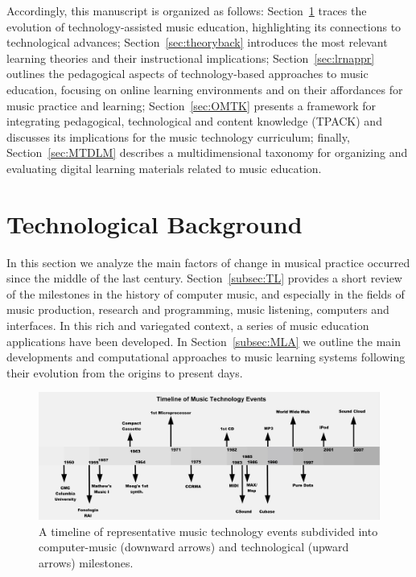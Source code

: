 \documentclass[journal]{IEEEtran}
\begin{document}
Accordingly, this manuscript is organized as follows: Section~\ref{sec:techback} traces the evolution of technology-assisted music education, highlighting its connections to technological advances; Section~\ref{sec:theoryback} introduces the most relevant learning theories and their instructional implications; Section~\ref{sec:lrnappr} outlines the pedagogical aspects of technology-based approaches to music education, focusing on online learning environments and on their affordances for music practice and learning; Section~\ref{sec:OMTK} presents a framework for integrating pedagogical, technological and content knowledge (TPACK) and discusses its implications for the music technology curriculum; finally, Section~\ref{sec:MTDLM} describes a multidimensional taxonomy for organizing and evaluating digital learning materials related to music education.


\section{Technological Background}
\label{sec:techback}

In this section we analyze the main factors of change in musical practice occurred since the middle of the last century. 
Section~\ref{subsec:TL} provides a short review of the milestones in the history of computer music, and especially in the fields of music production, research and programming, music listening, computers and interfaces. In this rich and variegated context, a series of music education applications have been developed. In Section~\ref{subsec:MLA} we outline the main developments and computational approaches to music learning systems following their evolution from the origins to present days.

\begin{figure}[t]
	\includegraphics[width=\textwidth]{images/timeline1.jpg}
	\caption{A timeline of representative music technology events subdivided into computer-music (downward arrows) and technological (upward arrows) milestones.}
	\label{fig:MTT}       
\end{figure}
\end{document}
